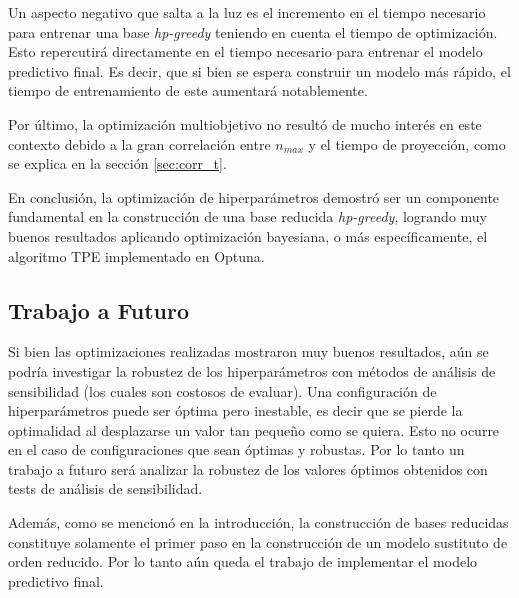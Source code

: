 Un aspecto negativo que salta a la luz es el incremento en el tiempo necesario para entrenar una base \textit{hp-greedy} teniendo en cuenta el tiempo de optimización. Esto repercutirá directamente en el tiempo necesario para entrenar el modelo predictivo final. Es decir, que si bien se espera construir un modelo más rápido, el tiempo de entrenamiento de este aumentará notablemente.

Por último, la optimización multiobjetivo no resultó de mucho interés en este contexto debido a la gran correlación entre $n_{max}$ y el tiempo de proyección, como se explica en la sección \ref{sec:corr_t}.


En conclusión, la optimización de hiperparámetros demostró ser un componente fundamental en la construcción de una base reducida \textit{hp-greedy}, logrando muy buenos resultados aplicando optimización bayesiana, o más específicamente, el algoritmo TPE implementado en Optuna.

\subsection*{Trabajo a Futuro}

Si bien las optimizaciones realizadas mostraron muy buenos resultados, aún se podría investigar la robustez de los hiperparámetros con métodos de análisis de sensibilidad (los cuales son costosos de evaluar). 
Una configuración de hiperparámetros puede ser óptima pero inestable, es decir que se pierde la optimalidad al desplazarse un valor tan pequeño como se quiera. Esto no ocurre en el caso de configuraciones que sean óptimas y robustas. Por lo tanto un trabajo a futuro será analizar la robustez de los valores óptimos obtenidos con tests de análisis de sensibilidad.


Además, como se mencionó en la introducción, la construcción de bases reducidas constituye solamente el primer paso en la construcción de un modelo sustituto de orden reducido. Por lo tanto aún queda el trabajo de implementar el modelo predictivo final.




